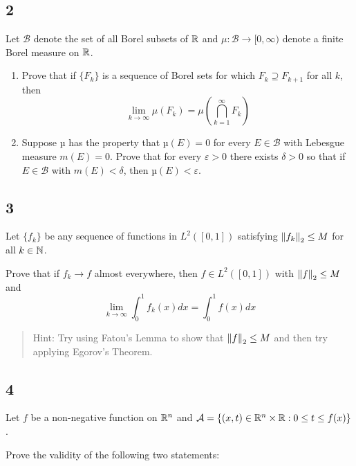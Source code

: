 \hypertarget{section-1}{%
\subsection{2}\label{section-1}}

Let \(\mathcal B\) denote the set of all Borel subsets of \({\mathbb{R}}\) and
\(\mu : \mathcal B \to [0, \infty)\) denote a finite Borel measure on
\({\mathbb{R}}\).

\begin{enumerate}
\def\labelenumi{\alph{enumi}.}
\tightlist
\item
  Prove that if \(\{F_k\}\) is a sequence of Borel sets for which
  \(F_k \supseteq F_{k+1}\) for all \(k\), then \[
    \lim _{k \rightarrow \infty} \mu\left(F_{k}\right)=\mu\left(\bigcap_{k=1}^{\infty} F_{k}\right)
    \]
\item
  Suppose \(µ\) has the property that \(µ(E) = 0\) for every
  \(E \in \mathcal B\) with Lebesgue measure \(m(E) = 0\). Prove that
  for every \(\varepsilon > 0\) there exists \(\delta > 0\) so that if
  \(E \in \mathcal B\) with \(m(E) < \delta\), then \(µ(E) < \varepsilon\).
\end{enumerate}

\hypertarget{section-2}{%
\subsection{3}\label{section-2}}

Let \(\{f_k\}\) be any sequence of functions in \(L^2([0, 1])\)
satisfying \({\left\lVert {f_k} \right\rVert}_2 \leq M\) for all \(k \in {\mathbb{N}}\).

Prove that if \(f_k \to f\) almost everywhere, then \(f \in L^2([0, 1])\)
with \({\left\lVert {f} \right\rVert}_2 \leq M\) and \[
\lim _{k \rightarrow \infty} \int_{0}^{1} f_{k}(x) dx = \int_{0}^{1} f(x) d x
\]

\begin{quote}
Hint: Try using Fatou's Lemma to show that \({\left\lVert {f} \right\rVert}_2 \leq M\) and then
try applying Egorov's Theorem.
\end{quote}

\hypertarget{section-3}{%
\subsection{4}\label{section-3}}

Let \(f\) be a non-negative function on \({\mathbb{R}}^n\) and
\(\mathcal A = \{(x, t) \in {\mathbb{R}}^n \times {\mathbb{R}} : 0 \leq t \leq f (x)\}\).

Prove the validity of the following two statements:

